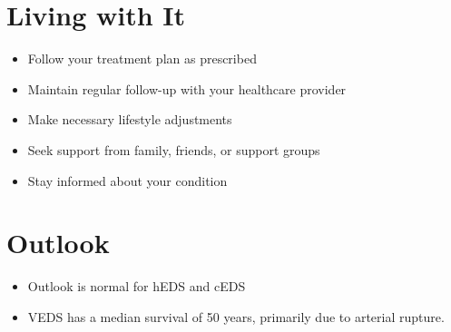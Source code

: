 \section{Living with It}
\begin{itemize}[noitemsep]
  \item Follow your treatment plan as prescribed
  \item Maintain regular follow-up with your healthcare provider
  \item Make necessary lifestyle adjustments
  \item Seek support from family, friends, or support groups
  \item Stay informed about your condition
\end{itemize}
\section{Outlook}
\begin{itemize}[noitemsep]
  \item Outlook is normal for hEDS and cEDS
  \item VEDS has a median survival of 50 years, primarily due to arterial rupture.
\end{itemize}
